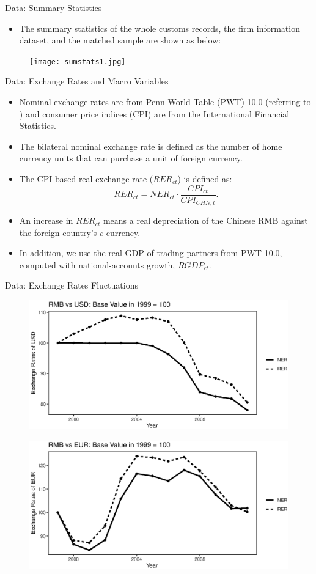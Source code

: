 \documentclass[10pt]{beamer}
\begin{document}
\begin{frame}{Data: Summary Statistics}
	\begin{itemize}
		\item The summary statistics of the whole customs records, the firm information dataset, and the matched sample are shown as below:
	\end{itemize}
	\begin{figure}[htbp]
		\centering
		\texttt{[image: sumstats1.jpg]}
		\label{sumstats1}
	\end{figure}
\end{frame}

\begin{frame}{Data: Exchange Rates and Macro Variables}
	\begin{itemize}
		\item Nominal exchange rates are from Penn World Table (PWT) 10.0 (referring to \cite{feenstra2015}) and consumer price indices (CPI) are from the International Financial Statistics.
		\item The bilateral nominal exchange rate is defined as the number of home currency units that can purchase a unit of foreign currency.
		\item The CPI-based real exchange rate ($RER_{ct}$) is defined as:
		$$
		RER_{ct}=NER_{ct} \cdot \frac{CPI_{ct}}{CPI_{CHN,t}}.
		$$
		\item An increase in $RER_{ct}$ means a real depreciation of the Chinese RMB against the
		foreign country’s $c$ currency.
		\item In addition, we use the real GDP of trading partners from PWT 10.0, computed with national-accounts growth, $RGDP_{ct}$.
	\end{itemize}
\end{frame}

\begin{frame}{Data: Exchange Rates Fluctuations}
		\begin{figure}[htbp]
			\centering
			\includegraphics[width=0.7\columnwidth]{R/USD.eps}
			\label{fig.USD}
		\end{figure}
		\begin{figure}[htbp]
			\centering
			\includegraphics[width=0.7\columnwidth]{R/EUR.eps}
			\label{fig.EUR}
		\end{figure}
\end{frame}
\end{document}
